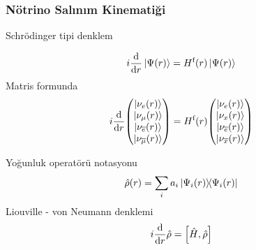 \documentclass[10pt]{beamer}
\begin{document}
\begin{frame}
    \frametitle{Nötrino Salınım Kinematiği}
\begin{minipage}{0.45\textwidth}
Schrödinger tipi denklem

\begin{align*}
    i\dv{r} \ket{\Psi(r)}= H^{\text{f}}(r) \ket{\Psi(r)}
\end{align*}
Matris formunda 
\begin{equation*}
    i\dv{r} \mqty(\ket{\nu_{e}(r)} \\ \ket{\nu_{\mu}(r)}\\ \ket{\nu_{\overline{e}}(r)}\\ \ket{\nu_{\overline{\mu}}(r)}) = H^{\text{f}}(r) \mqty(\ket{\nu_{e}(r)} \\ \ket{\nu_{x}(r)}\\ \ket{\nu_{\overline{e}}(r)}\\ \ket{\nu_{\overline{x}}(r)})
\end{equation*}
\end{minipage}%
\hfill
\begin{minipage}{0.45\textwidth}
    \color{lightgray}Yoğunluk operatörü notasyonu
\begin{equation*}
    \hat{\rho} (r) = \sum_{i} a_{i} \dyad{\Psi_{i}(r)}{\Psi_{i}(r)}
\end{equation*}
Liouville - von Neumann denklemi
\begin{equation*}
    i \dv{r} \hat{\rho} = \comm{\hat{H}}{\hat{\rho}}
\end{equation*}
\end{minipage}
\end{frame}
\end{document}
